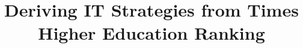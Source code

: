 \documentclass[conference]{IEEEtran}
\begin{document}
%

\title{Deriving IT Strategies from Times Higher Education Ranking}
\end{document}
